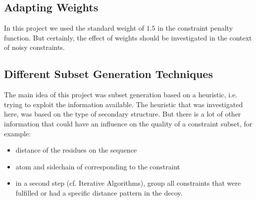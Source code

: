 \documentclass[a4paper, 11pt, parskip=half]{scrartcl}
\begin{document}
\subsection{Adapting Weights}

In this project we used the standard weight of $1.5$ in the constraint penalty function.
But certainly, the effect of weights should be investigated in the context of
noisy constraints.

\subsection{Different Subset Generation Techniques}

The main idea of this project was subset generation based on a heuristic,
i.e. trying to exploit the information available.
The heuristic that was investigated here, was based on the type of secondary structure.
But there is a lot of other information that could have an influence on the quality
of a constraint subset, for example:
\begin{itemize}
\item distance of the residues on the sequence
\item atom and sidechain of corresponding to the constraint
\item in a second step (cf. Iterative Algorithms), group all constraints that were fulfilled or had a specific distance pattern in the decoy.
\end{itemize}
\end{document}

